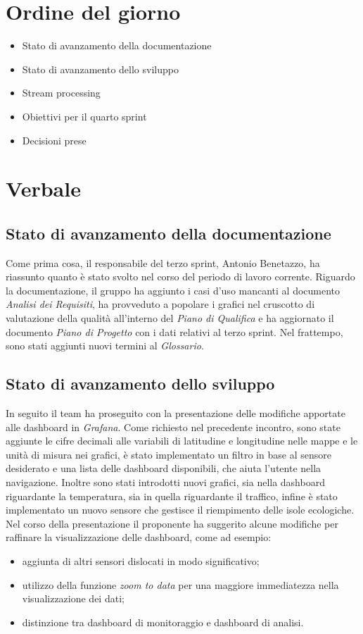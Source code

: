 \documentclass[italian,12pt]{article}
\begin{document}
\section{Ordine del giorno}
\begin{itemize}
	\item Stato di avanzamento della documentazione
	\item Stato di avanzamento dello sviluppo
	\item Stream processing
	\item Obiettivi per il quarto sprint
	\item Decisioni prese
\end{itemize}

\newpage

\section{Verbale}

\subsection{Stato di avanzamento della documentazione}
Come prima cosa, il responsabile del terzo sprint, Antonio Benetazzo, ha riassunto quanto è stato svolto nel corso del periodo di lavoro corrente.
Riguardo la documentazione, il gruppo ha aggiunto i casi d'uso mancanti al documento \textit{Analisi dei Requisiti}, 
ha provveduto a popolare i grafici nel cruscotto di valutazione della qualità all'interno del \textit{Piano di Qualifica} e
ha aggiornato il documento \textit{Piano di Progetto} con i dati relativi al terzo sprint. Nel frattempo, sono stati aggiunti nuovi termini al \textit{Glossario}.

\subsection{Stato di avanzamento dello sviluppo}
In seguito il team ha proseguito con la presentazione delle modifiche apportate alle dashboard in \textit{Grafana}. Come richiesto nel precedente
incontro, sono state aggiunte le cifre decimali alle variabili di latitudine e longitudine nelle mappe e le unità di misura nei grafici,
è stato implementato un filtro in base al sensore desiderato e una lista delle dashboard disponibili, che aiuta l'utente nella navigazione.
Inoltre sono stati introdotti nuovi grafici, sia nella dashboard riguardante la temperatura, sia in quella riguardante il traffico, infine
è stato implementato un nuovo sensore che gestisce il riempimento delle isole ecologiche. Nel corso della presentazione il proponente ha suggerito
alcune modifiche per raffinare la visualizzazione delle dashboard, come ad esempio:
\begin{itemize}
	\item aggiunta di altri sensori dislocati in modo significativo;
	\item utilizzo della funzione \textit{zoom to data} per una maggiore immediatezza nella visualizzazione dei dati;
	\item distinzione tra dashboard di monitoraggio e dashboard di analisi.
\end{itemize}
\end{document}
